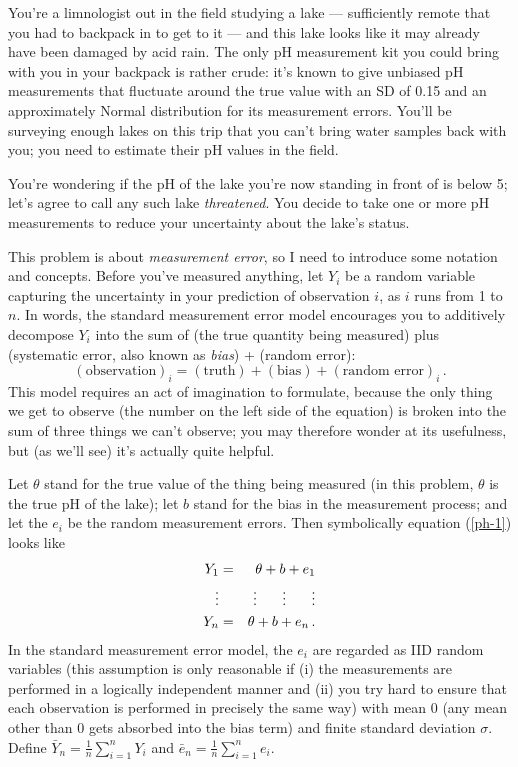 \documentclass[12pt]{article}
\begin{document}
You're a limnologist out in the field studying a lake --- sufficiently
remote that you had to backpack in to get to it --- and this lake looks
like it may already have been damaged by acid rain. The only pH
measurement kit you could bring with you in your backpack is rather crude:
it's known to give unbiased pH measurements that fluctuate around the true
value with an SD of 0.15 and an approximately Normal distribution for its
measurement errors. You'll be surveying enough lakes on this trip that you
can't bring water samples back with you; you need to estimate their pH
values in the field.  

You're wondering if the pH of the lake you're now standing in front of is
below 5; let's agree to call any such lake \textit{threatened}. You decide to take one or more pH measurements to reduce your uncertainty about the lake's status. 

This problem is about \textit{measurement error}, so I need to introduce some notation and concepts.
Before you've measured anything, let $Y_i$ be a random variable capturing the uncertainty in your prediction of observation $i$, as $i$ runs from 1 to $n$. In words, the standard measurement error model encourages you to additively decompose $Y_i$ into the sum of (the true quantity being measured) plus (systematic error, also known as \textit{bias}) + (random error):
\begin{equation} \label{ph-1}
( \text{observation} )_i = ( \text{truth} ) + ( \text{bias} ) + ( \text{random error} )_i \, .
\end{equation}
This model requires an act of imagination to formulate, because the only thing we get to observe (the number on the left side of the equation) is broken into the sum of three things we can't observe; you may therefore wonder at its usefulness, but (as we'll see) it's actually quite helpful.

Let $\theta$ stand for the true value of the thing being measured (in this problem, $\theta$ is the true pH of the lake); let $b$ stand for the bias in the measurement process; and let the $e_i$ be the random measurement errors. Then symbolically equation (\ref{ph-1}) looks like
\begin{eqnarray} \label{ph-2}
Y_1 & = & \theta + b + e_1 \nonumber \\
\vdots & & \vdots \hspace*{0.25in} \vdots \hspace*{0.25in} \vdots \nonumber \\
Y_n & = & \theta + b + e_n \, .
\end{eqnarray}
In the standard measurement error model, the $e_i$ are regarded as IID random variables (this assumption is only reasonable if (i) the measurements are performed in a logically independent manner and (ii) you try hard to ensure that each observation is performed in precisely the same way) with mean 0 (any mean other than 0 gets absorbed into the bias term) and finite standard deviation $\sigma$. Define $\bar{ Y }_n = \frac{ 1 }{ n } \sum_{ i = 1 }^n Y_i$ and $\bar{ e }_n = \frac{ 1 }{ n } \sum_{ i = 1 }^n e_i$.
\end{document}
